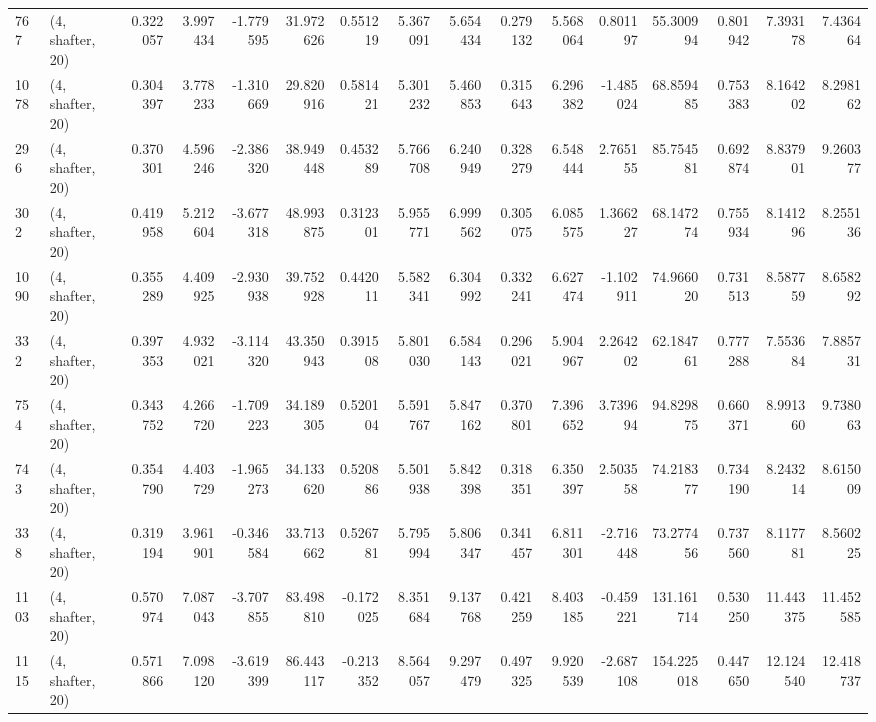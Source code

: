 \begin{tabular}{llrrrrrrrrrrrrrr}
767  &  (4, shafter, 20) &   0.322057 &   3.997434 &  -1.779595 &     31.972626 &    0.551219 &    5.367091 &    5.654434 &  0.279132 &   5.568064 &   0.801197 &    55.300994 &   0.801942 &   7.393178 &   7.436464 \\
1078 &  (4, shafter, 20) &   0.304397 &   3.778233 &  -1.310669 &     29.820916 &    0.581421 &    5.301232 &    5.460853 &  0.315643 &   6.296382 &  -1.485024 &    68.859485 &   0.753383 &   8.164202 &   8.298162 \\
296  &  (4, shafter, 20) &   0.370301 &   4.596246 &  -2.386320 &     38.949448 &    0.453289 &    5.766708 &    6.240949 &  0.328279 &   6.548444 &   2.765155 &    85.754581 &   0.692874 &   8.837901 &   9.260377 \\
302  &  (4, shafter, 20) &   0.419958 &   5.212604 &  -3.677318 &     48.993875 &    0.312301 &    5.955771 &    6.999562 &  0.305075 &   6.085575 &   1.366227 &    68.147274 &   0.755934 &   8.141296 &   8.255136 \\
1090 &  (4, shafter, 20) &   0.355289 &   4.409925 &  -2.930938 &     39.752928 &    0.442011 &    5.582341 &    6.304992 &  0.332241 &   6.627474 &  -1.102911 &    74.966020 &   0.731513 &   8.587759 &   8.658292 \\
332  &  (4, shafter, 20) &   0.397353 &   4.932021 &  -3.114320 &     43.350943 &    0.391508 &    5.801030 &    6.584143 &  0.296021 &   5.904967 &   2.264202 &    62.184761 &   0.777288 &   7.553684 &   7.885731 \\
754  &  (4, shafter, 20) &   0.343752 &   4.266720 &  -1.709223 &     34.189305 &    0.520104 &    5.591767 &    5.847162 &  0.370801 &   7.396652 &   3.739694 &    94.829875 &   0.660371 &   8.991360 &   9.738063 \\
743  &  (4, shafter, 20) &   0.354790 &   4.403729 &  -1.965273 &     34.133620 &    0.520886 &    5.501938 &    5.842398 &  0.318351 &   6.350397 &   2.503558 &    74.218377 &   0.734190 &   8.243214 &   8.615009 \\
338  &  (4, shafter, 20) &   0.319194 &   3.961901 &  -0.346584 &     33.713662 &    0.526781 &    5.795994 &    5.806347 &  0.341457 &   6.811301 &  -2.716448 &    73.277456 &   0.737560 &   8.117781 &   8.560225 \\
1103 &  (4, shafter, 20) &   0.570974 &   7.087043 &  -3.707855 &     83.498810 &   -0.172025 &    8.351684 &    9.137768 &  0.421259 &   8.403185 &  -0.459221 &   131.161714 &   0.530250 &  11.443375 &  11.452585 \\
1115 &  (4, shafter, 20) &   0.571866 &   7.098120 &  -3.619399 &     86.443117 &   -0.213352 &    8.564057 &    9.297479 &  0.497325 &   9.920539 &  -2.687108 &   154.225018 &   0.447650 &  12.124540 &  12.418737 \\

\end{tabular}
